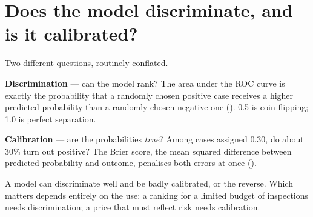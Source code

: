 \documentclass[
  letterpaper,
  10pt,
  twoside,
  openright,
  numbers=noenddot,
  chapterprefix=true]{scrbook}
\begin{document}
\section{Does the model discriminate, and is it
calibrated?}\label{does-the-model-discriminate-and-is-it-calibrated}

Two different questions, routinely conflated.

\begin{qmibdefinition}

{\textbf{Discrimination}} --- can the model rank? The area under the ROC
curve is exactly the probability that a randomly chosen positive case
receives a higher predicted probability than a randomly chosen negative
one (). 0.5 is
coin-flipping; 1.0 is perfect separation.

\end{qmibdefinition}

\begin{qmibdefinition}

{\textbf{Calibration}} --- are the probabilities \emph{true}? Among
cases assigned 0.30, do about 30\% turn out positive? The Brier score,
the mean squared difference between predicted probability and outcome,
penalises both errors at once ().

\end{qmibdefinition}

A model can discriminate well and be badly calibrated, or the reverse.
Which matters depends entirely on the use: a ranking for a limited
budget of inspections needs discrimination; a price that must reflect
risk needs calibration.
\end{document}
